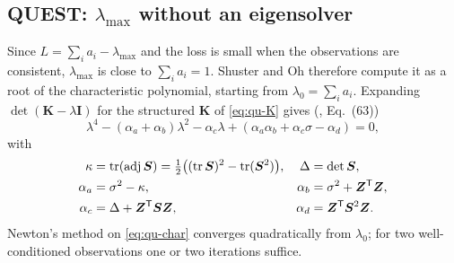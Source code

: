 \subsection{QUEST: \texorpdfstring{$\lambda_{\max}$}{lambda-max} without an eigensolver}
Since $L=\sum_i a_i-\lambda_{\max}$ and the loss is small when the observations are consistent,
$\lambda_{\max}$ is close to $\sum_i a_i = 1$. Shuster and Oh therefore compute it as a root of the
characteristic polynomial, starting from $\lambda_0=\sum_i a_i$. Expanding
$\det(\bm{K}-\lambda\bm{I})$ for the structured $\bm{K}$ of \eqref{eq:qu-K} gives
(\cite{shusteroh1981}, Eq.~(63))
\begin{equation}
\lambda^4-(\alpha_a+\alpha_b)\lambda^2-\alpha_c\lambda+(\alpha_a\alpha_b+\alpha_c\sigma-\alpha_d)=0,
\label{eq:qu-char}
\end{equation}
with
\begin{align}
\kappa&=\operatorname{tr}(\operatorname{adj}\bm{S})=\tfrac12\big((\operatorname{tr}\bm{S})^2-\operatorname{tr}(\bm{S}^2)\big),
&\Delta&=\det\bm{S},\nonumber\\
\alpha_a&=\sigma^2-\kappa, &\alpha_b&=\sigma^2+\bm{Z}^{\mathsf{T}}\bm{Z},\label{eq:qu-abcd}\\
\alpha_c&=\Delta+\bm{Z}^{\mathsf{T}}\bm{S}\bm{Z}, &\alpha_d&=\bm{Z}^{\mathsf{T}}\bm{S}^2\bm{Z}.\nonumber
\end{align}
Newton's method on \eqref{eq:qu-char} converges quadratically from $\lambda_0$; for two
well-conditioned observations one or two iterations suffice.

